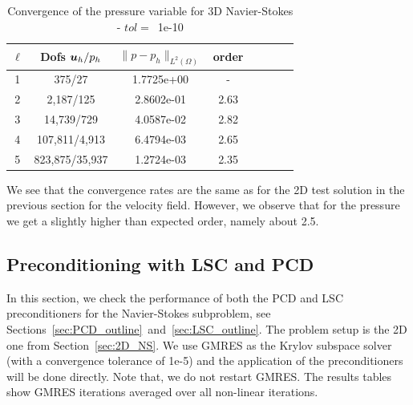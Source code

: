 \begin{table}[h!]
\begin{center}
    \begin{tabular}{cccccccc}
    \hline
    $\ell$ &    Dofs $\boldsymbol u_h/p_h$ &  $\|{p}-{p}_h\|_{L^2(\Omega)}$ & order \\
    \hline
    1 &    375/27 &  1.7725e+00 &      - \\
    2 &   2,187/125 &    2.8602e-01 &      2.63 \\
    3 &   14,739/729 &    4.0587e-02 &      2.82 \\
    4 &  107,811/4,913 &     6.4794e-03 &      2.65 \\
    5 &  823,875/35,937 &     1.2724e-03 &      2.35 \\
    \hline
    \end{tabular}
\caption{Convergence of the pressure variable for 3D Navier-Stokes - $tol=$~1e-10}
\label{tab:NS_3D_smooth_pressure}
\end{center}
\end{table}

We see that the convergence rates are the same as for the 2D test solution in the previous section for the velocity field. However, we observe that for the pressure we get a slightly higher than expected order, namely about 2.5.

\subsection{Preconditioning with LSC and PCD}


In this section, we check the performance of both the PCD and LSC preconditioners for the Navier-Stokes subproblem, see Sections~\ref{sec:PCD_outline}~and~\ref{sec:LSC_outline}. The problem setup is the 2D one from Section~\ref{sec:2D_NS}. We use GMRES as the Krylov subspace solver (with a convergence tolerance of 1e-5) and the application of the preconditioners will be done directly. Note that, we do not restart GMRES. The results tables show GMRES iterations averaged over all non-linear iterations.


